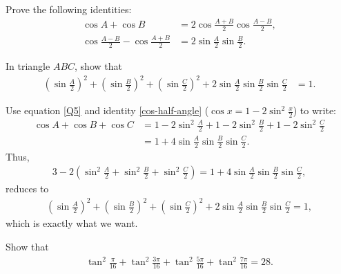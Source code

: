 \documentclass[12pt,a4paper]{memoir}
\theoremstyle{definition}
\begin{document}
\begin{question}
	Prove the following identities:
	\begin{align*}
		\cos A + \cos B &= 2 \cos{\frac{A + B}{2}} \cos{\frac{A - B}{2}},\\
		\cos{\frac{A - B}{2}} - \cos{\frac{A + B}{2}} &= 2 \sin{\frac A 2} \sin{\frac B 2}.
	\end{align*}
\end{question}


\begin{question}
	In triangle $ABC$, show that
	\begin{align}
		\left(\sin{\frac{A}{2}}\right)^2+\left(\sin{\frac{B}{2}}\right)^2+\left(\sin{\frac{C}{2}}\right)^2 +2\sin{\frac{A}{2}}\sin{\frac{B}{2}}\sin{\frac{C}{2}} &= 1.
	\end{align}
\end{question}

\begin{solution}
	Use equation \eqref{Q5} and identity \eqref{cos-half-angle} ($\cos x = 1 -2 \sin^2 \frac x2$) to write:
	\begin{align*}
		\cos{A} +\cos{B}+\cos{C}&= 1 - 2\sin^2 \frac A2+ 1 - 2\sin^2 \frac B2 + 1 - 2\sin^2 \frac C2\\
		&=1+4\sin{\frac{A}{2}}\sin{\frac{B}{2}}\sin{\frac{C}{2}}.
	\end{align*}
	Thus,
	\begin{align*}
		3 - 2 \left( \sin^2 \frac A2 + \sin^2 \frac B2 + \sin^2 \frac C2\right) = 1 + 4\sin{\frac{A}{2}}\sin{\frac{B}{2}}\sin{\frac{C}{2}},
	\end{align*}
	reduces to
	\begin{align*}
		\left(\sin{\frac{A}{2}}\right)^2+\left(\sin{\frac{B}{2}}\right)^2+\left(\sin{\frac{C}{2}}\right)^2 +2\sin{\frac{A}{2}}\sin{\frac{B}{2}}\sin{\frac{C}{2}} = 1,
	\end{align*}
	which is exactly what we want.
\end{solution}


\begin{question}
	Show that
	\begin{align*}
		\tan^2\frac{\pi}{16}+ \tan^2\frac{3\pi}{16}+\tan^2\frac{5\pi}{16} + \tan^2\frac{7\pi}{16} = 28.
	\end{align*}
\end{question}
\end{document}
